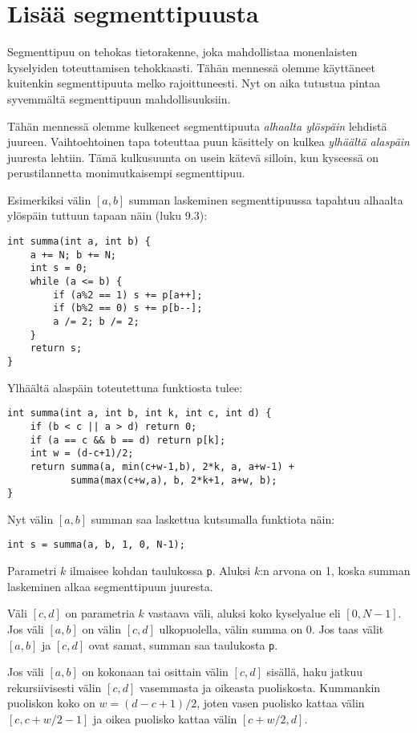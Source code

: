 \chapter{Lisää segmenttipuusta}


Segmenttipuu on tehokas tietorakenne,
joka mahdollistaa monenlaisten
kyselyiden toteuttamisen tehokkaasti.
Tähän mennessä olemme käyttäneet
kuitenkin segmenttipuuta melko rajoittuneesti.
Nyt on aika tutustua pintaa syvemmältä
segmenttipuun mahdollisuuksiin.

Tähän mennessä olemme kulkeneet segmenttipuuta
\textit{alhaalta ylöspäin} lehdistä juureen.
Vaihtoehtoinen tapa toteuttaa puun käsittely
on kulkea \textit{ylhäältä alaspäin} juuresta lehtiin.
Tämä kulkusuunta on usein kätevä silloin,
kun kyseessä on perustilannetta
monimutkaisempi segmenttipuu.

Esimerkiksi välin $[a,b]$ summan laskeminen
segmenttipuussa tapahtuu alhaalta ylöspäin 
tuttuun tapaan näin (luku 9.3):

\begin{lstlisting}
int summa(int a, int b) {
    a += N; b += N;
    int s = 0;
    while (a <= b) {
        if (a%2 == 1) s += p[a++];
        if (b%2 == 0) s += p[b--];
        a /= 2; b /= 2;
    }
    return s;
}
\end{lstlisting}
Ylhäältä alaspäin toteutettuna funktiosta tulee:

\begin{lstlisting}
int summa(int a, int b, int k, int c, int d) {
    if (b < c || a > d) return 0;
    if (a == c && b == d) return p[k];
    int w = (d-c+1)/2;
    return summa(a, min(c+w-1,b), 2*k, a, a+w-1) +
           summa(max(c+w,a), b, 2*k+1, a+w, b);
}
\end{lstlisting}
Nyt välin $[a,b]$ summan saa laskettua
kutsumalla funktiota näin:

\begin{lstlisting}
int s = summa(a, b, 1, 0, N-1);
\end{lstlisting}

Parametri $k$ ilmaisee kohdan
taulukossa \texttt{p}.
Aluksi $k$:n arvona on 1,
koska summan laskeminen alkaa
segmenttipuun juuresta.

Väli $[c,d]$ on parametria $k$ vastaava väli,
aluksi koko kyselyalue eli $[0,N-1]$.
Jos väli $[a,b]$ on välin $[c,d]$
ulkopuolella, välin summa on 0.
Jos taas välit $[a,b]$ ja $[c,d]$
ovat samat, summan saa taulukosta \texttt{p}.

Jos väli $[a,b]$ on kokonaan tai osittain välin $[c,d]$
sisällä, haku jatkuu rekursiivisesti
välin $[c,d]$ vasemmasta ja oikeasta puoliskosta.
Kummankin puoliskon koko on $w=(d-c+1)/2$,
joten vasen puolisko kattaa välin $[c,c+w/2-1]$
ja oikea puolisko kattaa välin $[c+w/2,d]$.


